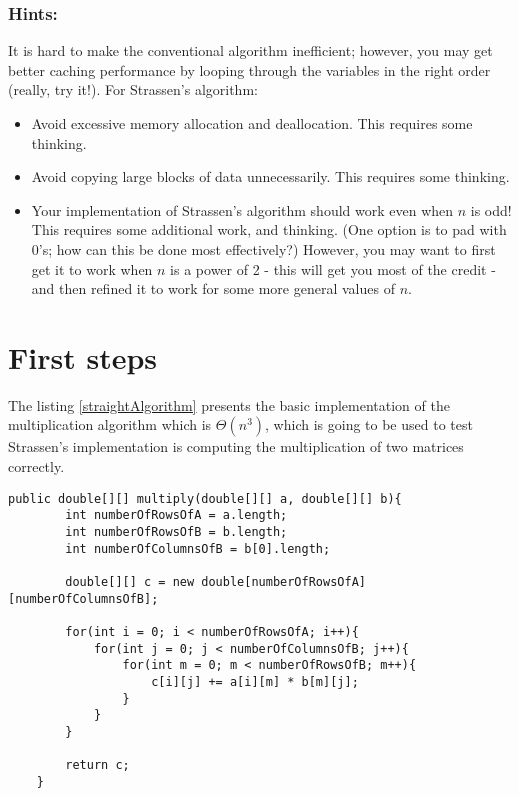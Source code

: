 \documentclass[tikz, 12pt]{scrartcl}
\begin{document}
\subsubsection*{Hints:}
It is hard to make the conventional algorithm inefficient; however, you may get better caching performance by looping through the variables in the right order (really, try it!). For Strassen's algorithm:

\begin{itemize}
	\item Avoid excessive memory allocation and deallocation. This requires some thinking.
	\item Avoid copying large blocks of data unnecessarily. This requires some thinking.
	\item Your implementation of Strassen's algorithm should work even when $n$ is odd! This requires some additional work, and thinking. (One option is to pad with 0's; how can this be done most effectively?) However, you may want to first get it to work when $n$ is a power of 2 - this will get you most of the credit - and then refined it to work for some more general values of $n$.
\end{itemize}

\section{First steps}

The listing \ref{straightAlgorithm} presents the basic implementation of the multiplication algorithm which is $\Theta(n^3)$, which is going to be used to test Strassen's implementation is computing the multiplication of two matrices correctly.



\begin{lstlisting}[caption={Basic implementation of straight algorithm},label={straightAlgorithm}]
public double[][] multiply(double[][] a, double[][] b){
		int numberOfRowsOfA = a.length;
		int numberOfRowsOfB = b.length;
		int numberOfColumnsOfB = b[0].length;
		
		double[][] c = new double[numberOfRowsOfA][numberOfColumnsOfB];
		
		for(int i = 0; i < numberOfRowsOfA; i++){
			for(int j = 0; j < numberOfColumnsOfB; j++){
				for(int m = 0; m < numberOfRowsOfB; m++){
					c[i][j] += a[i][m] * b[m][j];
				}
			}
		}
		
		return c;
	}
\end{lstlisting}
\end{document}
